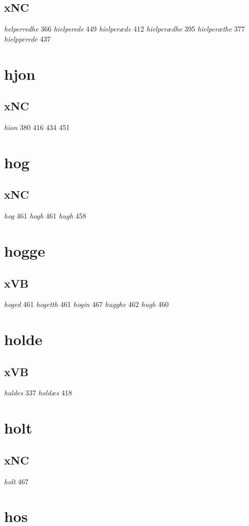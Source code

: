 \documentclass[a4paper,twocolumn]{article}
\begin{document}
\subsection{xNC}
\label{sec:org4bfd839}
\emph{helperredhe} 366 \emph{hielperede} 449 \emph{hielperæde} 412 \emph{hielperædhe} 395 \emph{hielperæthe} 377 \emph{hielpperede} 437 
\section{hjon}
\label{sec:org5243a65}
\subsection{xNC}
\label{sec:org599fe71}
\emph{hion} 380 416 434 451 
\section{hog}
\label{sec:org49cacae}
\subsection{xNC}
\label{sec:org0425eb5}
\emph{hog} 461 \emph{hogh} 461 \emph{hugh} 458 
\section{hogge}
\label{sec:orgc7011ab}
\subsection{xVB}
\label{sec:org6573d5f}
\emph{hoged} 461 \emph{hogetth} 461 \emph{hogin} 467 \emph{hugghe} 462 \emph{hugh} 460 
\section{holde}
\label{sec:orgd8ca531}
\subsection{xVB}
\label{sec:org98986c6}
\emph{haldes} 337 \emph{holdæs} 418 
\section{holt}
\label{sec:org62b333e}
\subsection{xNC}
\label{sec:org97cdf1f}
\emph{holt} 467 
\section{hos}
\label{sec:orgee35bb0}
\end{document}

